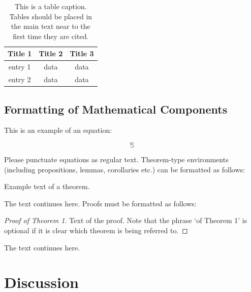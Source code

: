 \documentclass[bioengineering,article,submit,moreauthors,pdftex,10pt,a4paper]{mdpi}
\begin{document}
\begin{table}[H]
\caption{This is a table caption. Tables should be placed in the main text near to the first time they are cited.}
\centering
\begin{tabular}{ccc}
\toprule
\textbf{Title 1}	& \textbf{Title 2}	& \textbf{Title 3}\\
\midrule
entry 1		& data			& data\\
entry 2		& data			& data\\
\bottomrule
\end{tabular}
\end{table}

\subsection{Formatting of Mathematical Components}

This is an example of an equation:

\begin{equation}
\mathbb{S}
\end{equation}

Please punctuate equations as regular text. Theorem-type environments (including propositions, lemmas, corollaries etc.) can be formatted as follows:
\begin{Theorem}
Example text of a theorem.
\end{Theorem}

The text continues here. Proofs must be formatted as follows:

\begin{proof}[Proof of Theorem 1]
Text of the proof. Note that the phrase `of Theorem 1' is optional if it is clear which theorem is being referred to.
\end{proof}
The text continues here.


\section{Discussion}
\end{document}
